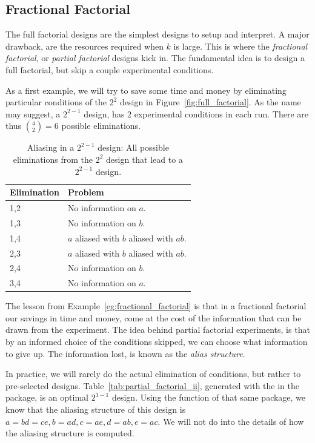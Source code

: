 \subsection{Fractional Factorial}
The full factorial designs are the simplest designs to setup and interpret. 
A major drawback, are the resources required when $k$ is large. 
This is where the \emph{fractional factorial}, or \emph{partial factorial} designs kick in.
The fundamental idea is to design a full factorial, but skip a couple experimental conditions. 


\begin{example}[From $2^2$ to $2^{(2-1)}$]
\label{eg:fractional_factorial}
As a first example, we will try to save some time and money by eliminating particular conditions of the $2^2$ design in Figure~\ref{fig:full_factorial}.
As the name may suggest, a $2^{2-1}$ design, has $2$ experimental conditions in each run. 
There are thus $\binom{4}{2}=6$ possible eliminations.
\begin{table}[ht]
\begin{tabular}{|p{2.5cm}|p{10cm}|}
\hline Elimination &  Problem \\ 
\hline
\hline 1,2 &  No information on $a$. \\ 
\hline 1,3 &  No information on $b$.\\ 
\hline 1,4 &  $a$ aliased with $b$ aliased with $ab$. \\ 
\hline 2,3 &  $a$ aliased with $b$ aliased with $ab$. \\ 
\hline 2,4 &  No information on $b$. \\ 
\hline 3,4 &  No information on $a$.\\ 
\hline 
\end{tabular} 
\label{tab:partial_factorial}
\caption{Aliasing in a $2^{2-1}$ design: All possible eliminations from the $2^2$ design that lead to a $2^{2-1}$ design.}
\end{table}
\end{example}

The lesson from Example~\ref{eg:fractional_factorial} is that in a fractional factorial our savings in time and money, come at the cost of the information that can be drawn from the experiment.
The idea behind partial factorial experiments, is that by an informed choice of the conditions skipped, we can choose what information to give up. The information lost, is known as the \emph{alias structure}.

In practice, we will rarely do the actual elimination of conditions, but rather to pre-selected designs. 
Table~\ref{tab:partial_factorial_ii}, generated with the  in the  \R package, is an optimal $2^{3-1}$ design.
Using the  function of that same package, we know that the aliasing structure of this design is
$a=bd=ce, b=ad, c=ae, d=ab, e=ac$.
We will not do into the details of how the aliasing structure is computed. 

